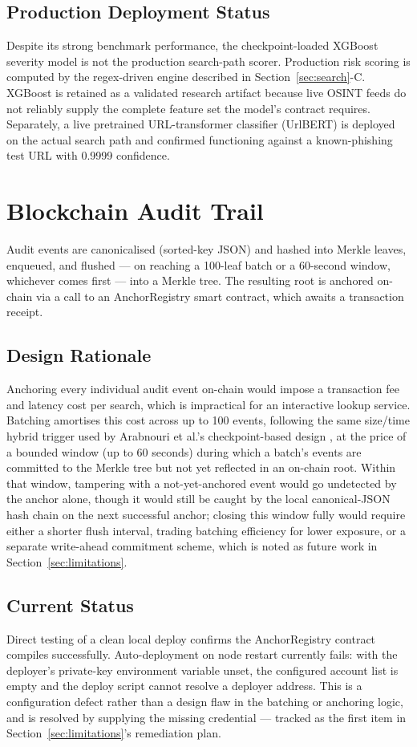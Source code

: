\documentclass[conference]{IEEEtran}
\begin{document}
\subsection{Production Deployment Status}
Despite its strong benchmark performance, the checkpoint-loaded XGBoost severity model is not the production search-path scorer. Production risk scoring is computed by the regex-driven engine described in Section~\ref{sec:search}-C. XGBoost is retained as a validated research artifact because live OSINT feeds do not reliably supply the complete feature set the model's contract requires. Separately, a live pretrained URL-transformer classifier (UrlBERT) is deployed on the actual search path and confirmed functioning against a known-phishing test URL with 0.9999 confidence.

\section{Blockchain Audit Trail}
\label{sec:blockchain}
Audit events are canonicalised (sorted-key JSON) and hashed into Merkle leaves, enqueued, and flushed --- on reaching a 100-leaf batch or a 60-second window, whichever comes first --- into a Merkle tree. The resulting root is anchored on-chain via a call to an AnchorRegistry smart contract, which awaits a transaction receipt.

\subsection{Design Rationale}
Anchoring every individual audit event on-chain would impose a transaction fee and latency cost per search, which is impractical for an interactive lookup service. Batching amortises this cost across up to 100 events, following the same size/time hybrid trigger used by Arabnouri et al.'s checkpoint-based design \cite{arabnouri2024secure}, at the price of a bounded window (up to 60 seconds) during which a batch's events are committed to the Merkle tree but not yet reflected in an on-chain root. Within that window, tampering with a not-yet-anchored event would go undetected by the anchor alone, though it would still be caught by the local canonical-JSON hash chain on the next successful anchor; closing this window fully would require either a shorter flush interval, trading batching efficiency for lower exposure, or a separate write-ahead commitment scheme, which is noted as future work in Section~\ref{sec:limitations}.

\subsection{Current Status}
Direct testing of a clean local deploy confirms the AnchorRegistry contract compiles successfully. Auto-deployment on node restart currently fails: with the deployer's private-key environment variable unset, the configured account list is empty and the deploy script cannot resolve a deployer address. This is a configuration defect rather than a design flaw in the batching or anchoring logic, and is resolved by supplying the missing credential --- tracked as the first item in Section~\ref{sec:limitations}'s remediation plan.
\end{document}
